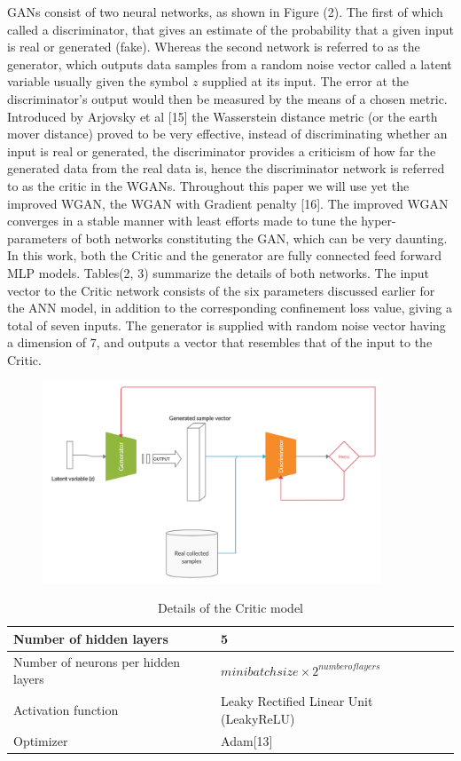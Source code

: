 \documentclass[draft, a4, 10pt, onecolumn]{IEEEtran}
\begin{document}
GANs consist of two neural networks, as shown in Figure (2). The first of which called a discriminator, that gives an estimate of the probability that a given input is real or generated (fake). Whereas the second network is referred to as the generator, which outputs data samples from a random noise vector called a latent variable usually given the symbol $z$ supplied at its input. The error at the discriminator's output would then be measured by the means of a chosen metric. Introduced by Arjovsky et al [15] the Wasserstein distance metric (or the earth mover distance) proved to be very effective, instead of discriminating whether an input is real or generated, the discriminator provides a criticism of how far the generated data from the real data is, hence the discriminator network is referred to as the critic in the WGANs. Throughout this paper we will use yet the improved WGAN, the WGAN with Gradient penalty [16]. The improved WGAN converges in a stable manner with least efforts made to tune the hyper- parameters of both networks constituting the GAN, which can be very daunting.
In this work, both the Critic and the generator are fully connected feed forward MLP models. Tables(2, 3) summarize the details of both networks. The input vector to the Critic network consists of the six parameters discussed earlier for the ANN model, in addition to the corresponding confinement loss value, giving a total of seven inputs. The generator is supplied with random noise vector having a dimension of $7$, and outputs a vector that resembles that of the input to the Critic.

\begin{figure}
\centering
\includegraphics[trim= 0 0 0 0, clip, width=0.9\textwidth]{GAN.png}
\caption{}
\end{figure}

\begin{table}[h]
\centering
\begin{tabular}{|l|l|}
\hline
Number of hidden layers & 5  \\
\hline
Number of neurons per hidden layers & $ minibatchsize\times2^{number of layers} $  \\
\hline
Activation function & Leaky Rectified Linear Unit (LeakyReLU)  \\
\hline
Optimizer & Adam[13]  \\
\hline
    \end{tabular}
\caption{Details of the Critic model}    
\end{table}
\end{document}
